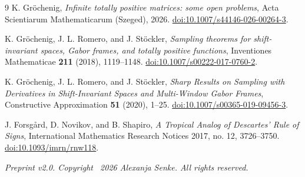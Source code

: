 \documentclass[11pt]{article}
\begin{document}
\begin{thebibliography}{9}
K. Gr\"ochenig,
\emph{Infinite totally positive matrices: some open problems},
Acta Scientiarum Mathematicarum (Szeged), 2026.
\href{https://doi.org/10.1007/s44146-026-00264-3}{doi:10.1007/s44146-026-00264-3}.

K. Gr\"ochenig, J. L. Romero, and J. St\"ockler,
\emph{Sampling theorems for shift-invariant spaces, Gabor frames, and totally positive functions},
Inventiones Mathematicae \textbf{211} (2018), 1119--1148.
\href{https://doi.org/10.1007/s00222-017-0760-2}{doi:10.1007/s00222-017-0760-2}.

K. Gr\"ochenig, J. L. Romero, and J. St\"ockler,
\emph{Sharp Results on Sampling with Derivatives in Shift-Invariant Spaces and Multi-Window Gabor Frames},
Constructive Approximation \textbf{51} (2020), 1--25.
\href{https://doi.org/10.1007/s00365-019-09456-3}{doi:10.1007/s00365-019-09456-3}.

J. Forsg\aa rd, D. Novikov, and B. Shapiro,
\emph{A Tropical Analog of Descartes' Rule of Signs},
International Mathematics Research Notices 2017, no. 12, 3726--3750.
\href{https://doi.org/10.1093/imrn/rnw118}{doi:10.1093/imrn/rnw118}.
\end{thebibliography}

\vfill
\begin{center}
\small\textit{Preprint v2.0. Copyright \textcopyright\ 2026 Alexanja Senke. All rights reserved.}
\end{center}
\end{document}
